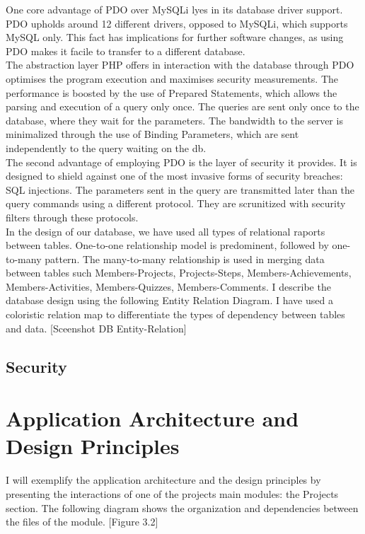 One core advantage of PDO over MySQLi lyes in its database driver support. PDO upholds around 12 different drivers, opposed to MySQLi, which supports MySQL only. This fact has implications for further software changes, as using PDO makes it facile to transfer to a different database.\\  

The abstraction layer PHP offers in interaction with the database through PDO optimises the program execution and maximises security measurements.
The performance is boosted by the use of Prepared Statements, which allows the parsing and execution of a query only once. The queries are sent only once to the database, where they wait for the parameters. The bandwidth to the server is minimalized through the use of Binding Parameters, which are sent independently to the query waiting on the db.\\ 

The second advantage of employing PDO is the layer of security it provides. It is designed to shield against one of the most invasive forms of security breaches: SQL injections. The parameters sent in the query are transmitted later than the query commands using a different protocol. They are scrunitized with security filters through these protocols.\\ 

In the design of our database, we have used all types of relational raports between tables. One-to-one relationship model is predominent, followed by one-to-many pattern. 
The many-to-many relationship is used in merging data between tables such Members-Projects, Projects-Steps, Members-Achievements, Members-Activities, Members-Quizzes, Members-Comments.
I describe the database design using the following Entity Relation Diagram. I have used a coloristic relation map to differentiate the types of dependency between tables and data.
[Sceenshot DB Entity-Relation]\\


\subsection{Security} 


\section{Application Architecture and Design Principles}

I will exemplify the application architecture and the design principles by presenting the interactions of one of the projects main modules: the Projects section. The following diagram shows the organization and dependencies between the files of the module. [Figure 3.2]

